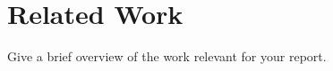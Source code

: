 \chapter{Related Work}\label{chap:relatedwork}
Give a brief overview of the work relevant for your report. 